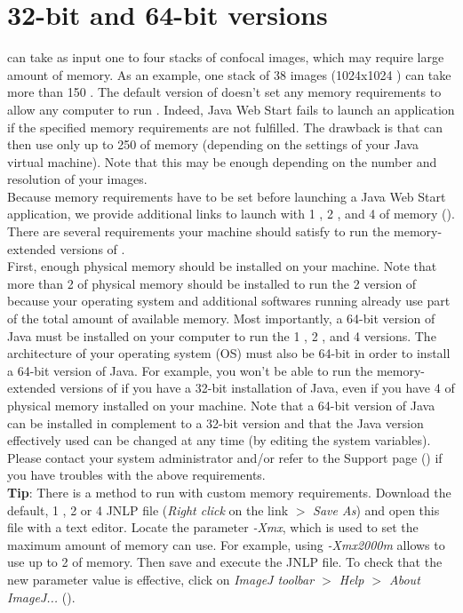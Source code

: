 \section{32-bit and 64-bit versions}\label{sec:32and64-bits}
\wingj can take as input one to four stacks of confocal images, which may require large amount of memory. As an example, one stack of 38 images (1024x1024 \px) can take more than 150 \MB. The default version of \wingj doesn't set any memory requirements to allow any computer to run \wingj. Indeed, Java Web Start fails to launch an application if the specified memory requirements are not fulfilled. The drawback is that \wingj can then use only up to 250 \MB of memory (depending on the settings of your Java virtual machine). Note that this may be enough depending on the number and resolution of your images.\\

Because memory requirements have to be set before launching a Java Web Start application, we provide additional links to launch \wingj with 1 \GB, 2 \GB, and 4 \GB of memory (\wingjShortUrl). There are several requirements your machine should satisfy to run the memory-extended versions of \wingj.\\

First, enough physical memory should be installed on your machine. Note that more than 2 \GB of physical memory should be installed to run the 2 \GB version of \wingj because your operating system and additional softwares running already use part of the total amount of available memory. Most importantly, a 64-bit version of Java must be installed on your computer to run the 1 \GB, 2 \GB, and 4 \GB versions. The architecture of your operating system (OS) must also be 64-bit in order to install a 64-bit version of Java. For example, you won't be able to run the memory-extended versions of \wingj if you have a 32-bit installation of Java, even if you have 4 \GB of physical memory installed on your machine. Note that a 64-bit version of Java can be installed in complement to a 32-bit version and that the Java version effectively used can be changed at any time (by editing the system variables). Please contact your system administrator and/or refer to the Support page (\wingjShortUrl) if you have troubles with the above requirements.\\

\textbf{Tip}: There is a method to run \wingj with custom memory requirements. Download the default, 1 \GB, 2 \GB or 4 \GB \wingj JNLP file (\textit{Right click} on the link $>$ \textit{Save As}) and open this file with a text editor. Locate the parameter \textit{-Xmx}, which is used to set the maximum amount of memory \wingj can use. For example, using \textit{-Xmx2000m} allows \wingj to use up to 2 \GB of memory. Then save and execute the JNLP file. To check that the new parameter value is effective, click on \textit{ImageJ toolbar $>$ Help $>$ About ImageJ...} ().\\


